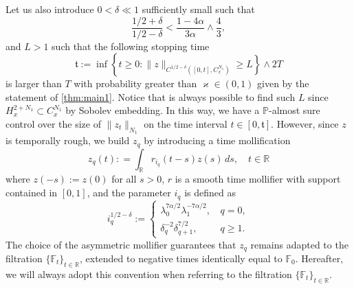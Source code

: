 \documentclass[10pt,a4paper]{amsart}
\numberwithin{equation}{section}
\numberwithin{corollario}{section}
\numberwithin{lemma}{section}
\numberwithin{prop}{section}
\theoremstyle{definition}
\theoremstyle{remark}
\newcommand{\R}{\mathbb{R}}
\begin{document}
Let us also introduce $0<\delta \ll 1$ sufficiently small such that 
\[\frac{1/2+\delta}{1/2-\delta}<\frac{1-4\alpha}{3\alpha}\wedge \frac43,\]
and $L>1$ such that the following stopping time
\begin{equation}\label{stoppingtime}
    \mathfrak{t}:=\inf\left\{t\geq 0: 
    \|z\|_{C^{1/2-\delta}([0,t],C_x^{N_1})}\geq L\right\}\wedge 2T
\end{equation}
is larger than $T$ with probability greater than $\varkappa \in (0,1)$ given by the statement of \autoref{thm:main1}.
Notice that is always possible to find such $L$ since $H^{2+N_1}_x \subset C^{N_1}_x$ by Sobolev embedding. 
In this way, we have a $\mathbb{P}$-almost sure control over the size of $\| z_t \|_{N_1}$ on the time interval $t \in [0,\mathfrak{t}]$.
However, since $z$ is temporally rough, we build $z_q$ by introducing a time mollification
\begin{equation}\label{e:SmoothNoise}
    z_q(t): =\int_{\R}r_{i_q}(t-s)z(s)\,ds,
    \quad
    t \in \R
\end{equation}
where $z(-s):=z(0)$ for all $s>0$, $r$ is a smooth time mollifier with support contained in $[0,1]$, and the parameter $i_q$ is defined as 
\begin{equation}
i_q^{1/2-\delta} :=\begin{cases}
    \lambda_0^{7\alpha/2}\lambda_1^{-7\alpha/2},\, &q=0,\\
    \delta_q^{-2}\delta_{q+1}^{7/2},\, &q\geq 1.
\end{cases}
\end{equation}
The choice of the asymmetric mollifier guarantees that $z_q$ remains adapted to the filtration $\{ \mathbb{F}_t\}_{t\in \R}$, extended to negative times identically equal to $\mathbb{F}_0$. Hereafter, we will always adopt this convention when referring to the filtration $\{ \mathbb{F}_t\}_{t\in \R}$. 
\end{document}
